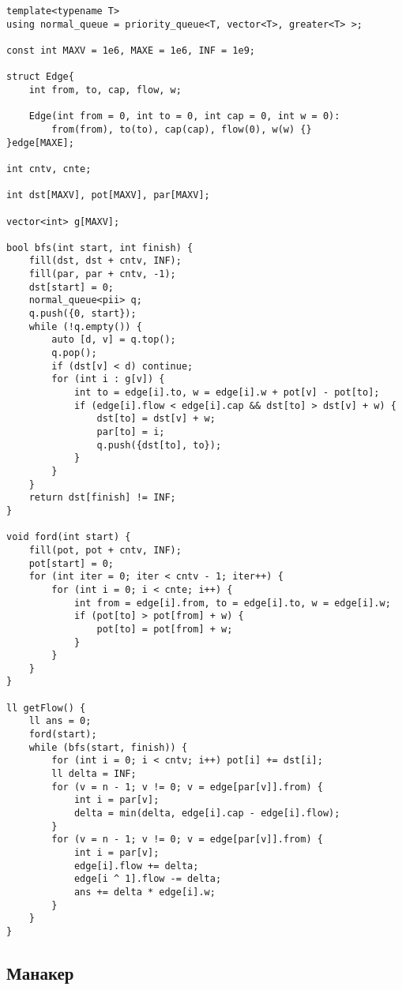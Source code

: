 \documentclass{article}
\begin{document}
    \begin{verbatim}
template<typename T>
using normal_queue = priority_queue<T, vector<T>, greater<T> >;

const int MAXV = 1e6, MAXE = 1e6, INF = 1e9;

struct Edge{
    int from, to, cap, flow, w;

    Edge(int from = 0, int to = 0, int cap = 0, int w = 0):
        from(from), to(to), cap(cap), flow(0), w(w) {}
}edge[MAXE];

int cntv, cnte;

int dst[MAXV], pot[MAXV], par[MAXV];

vector<int> g[MAXV];

bool bfs(int start, int finish) {
    fill(dst, dst + cntv, INF);
    fill(par, par + cntv, -1);
    dst[start] = 0;
    normal_queue<pii> q;
    q.push({0, start});
    while (!q.empty()) {
        auto [d, v] = q.top();
        q.pop();
        if (dst[v] < d) continue;
        for (int i : g[v]) {
            int to = edge[i].to, w = edge[i].w + pot[v] - pot[to];
            if (edge[i].flow < edge[i].cap && dst[to] > dst[v] + w) {
                dst[to] = dst[v] + w;
                par[to] = i;
                q.push({dst[to], to});
            }
        }
    }
    return dst[finish] != INF;
}

void ford(int start) {
    fill(pot, pot + cntv, INF);
    pot[start] = 0;
    for (int iter = 0; iter < cntv - 1; iter++) {
        for (int i = 0; i < cnte; i++) {
            int from = edge[i].from, to = edge[i].to, w = edge[i].w;
            if (pot[to] > pot[from] + w) {
                pot[to] = pot[from] + w;
            }
        }
    }
}

ll getFlow() {
    ll ans = 0;
    ford(start);
    while (bfs(start, finish)) {
        for (int i = 0; i < cntv; i++) pot[i] += dst[i];
        ll delta = INF;
        for (v = n - 1; v != 0; v = edge[par[v]].from) {
            int i = par[v];
            delta = min(delta, edge[i].cap - edge[i].flow);
        }
        for (v = n - 1; v != 0; v = edge[par[v]].from) {
            int i = par[v];
            edge[i].flow += delta;
            edge[i ^ 1].flow -= delta;
            ans += delta * edge[i].w;
        }
    }
}
    \end{verbatim}   
    
    \subsection{Манакер}
    
\end{document}
